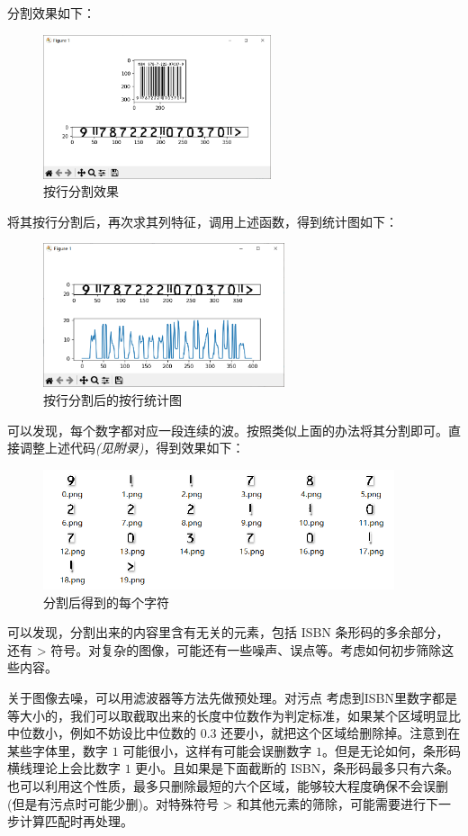 \documentclass{ctexart}
\begin{document}
分割效果如下：
\begin{figure}[H]
    \centering
    \includegraphics[height=120pt]{sample_splitRow}
    \caption{按行分割效果}
\end{figure}

将其按行分割后，再次求其列特征，调用上述函数，得到统计图如下：
\begin{figure}[H]
    \centering
    \includegraphics[height=120pt]{sample_splitRow_ana}
    \caption{按行分割后的按行统计图}
\end{figure}

可以发现，每个数字都对应一段连续的波。按照类似上面的办法将其分割即可。直接调整上述代码\textit{(见附录)}，得到效果如下：
\begin{figure}[H]
    \centering
    \includegraphics[height=100pt]{sample_splitNum}
    \caption{分割后得到的每个字符}
\end{figure}

可以发现，分割出来的内容里含有无关的元素，包括 ISBN 条形码的多余部分，还有 > 符号。对复杂的图像，可能还有一些噪声、误点等。考虑如何初步筛除这些内容。

关于图像去噪，可以用滤波器等方法先做预处理。对污点
考虑到ISBN里数字都是等大小的，我们可以取截取出来的长度中位数作为判定标准，如果某个区域明显比中位数小，例如不妨设比中位数的 $0.3$ 还要小，就把这个区域给删除掉。注意到在某些字体里，数字 $1$ 可能很小，这样有可能会误删数字 $1$。但是无论如何，条形码横线理论上会比数字 $1$ 更小。且如果是下面截断的 ISBN，条形码最多只有六条。也可以利用这个性质，最多只删除最短的六个区域，能够较大程度确保不会误删(但是有污点时可能少删)。对特殊符号 > 和其他元素的筛除，可能需要进行下一步计算匹配时再处理。
\end{document}
